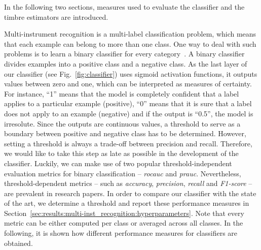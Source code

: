In the following two sections, measures used to evaluate the classifier and the timbre estimators are introduced.

Multi-instrument recognition is a multi-label classification problem, which means that each example can belong to more than one class. One way to deal with such problems is to learn a binary classifier for every category~\cite{tsoumakas2007multi}. A binary classifier divides examples into a positive class and a negative class. As the last layer of our classifier (see Fig.~\ref{fig:classifier}) uses sigmoid activation functions, it outputs values between zero and one, which can be interpreted as measures of certainty. For instance, \enquote{1} means that the model is completely confident that a label applies to a particular example (positive), \enquote{0} means that it is sure that a label does not apply to an example (negative) and if the output is \enquote{0.5}, the model is irresolute. Since the outputs are continuous values, a threshold to serve as a boundary between positive and negative class has to be determined. However, setting a threshold is always a trade-off between precision and recall. Therefore, we would like to take this step as late as possible in the development of the classifier. Luckily, we can make use of two popular threshold-independent evaluation metrics for binary classification -- \textit{\gls{rocauc}} and \textit{\gls{prauc}}. Nevertheless, threshold-dependent metrics -- such as \textit{accuracy}, \textit{precision}, \textit{recall} and \textit{F1-score} -- are prevalent in research papers. In order to compare our classifier with the state of the art, we determine a threshold and report these performance measures in Section~\ref{sec:results:multi-inst_recognition:hyperparameters}. Note that every metric can be either computed per class or averaged across all classes. In the following, it is shown how different performance measures for classifiers are obtained.\\

